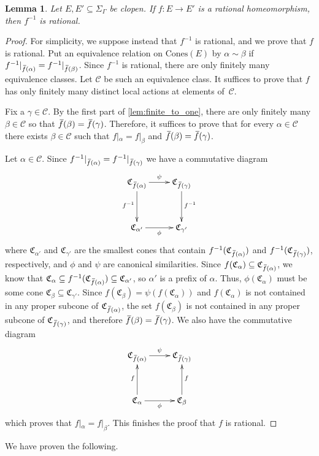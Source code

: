 \documentclass[11pt,letterpaper]{amsart}
\newtheorem{lemma}[theorem]{Lemma}
\theoremstyle{definition}
\newcommand{\C}{\mathfrak{C}}
\newcommand{\Cones}{\mathrm{Cones}}
\newcommand{\of}{\mkern 3.5mu\overline{\mkern-3.5mu f\mkern0.75mu}\mkern-0.75mu}
\begin{document}
\begin{lemma}\label{lem:inverses_rational}
Let $E,E'\subseteq \Sigma_\Gamma$ be clopen.  If $f\colon E\to E'$ is a rational homeomorphism, then $f^{-1}$ is rational.
\end{lemma}
\begin{proof}
For simplicity, we suppose instead that $f^{-1}$ is rational, and we prove that $f$ is rational.  Put an equivalence relation on $\Cones(E)$ by $\alpha\sim\beta$ if $f^{-1}|_{\of(\alpha)}=f^{-1}|_{\of(\beta)}$.  Since $f^{-1}$ is rational, there are only finitely many equivalence classes.  Let $\mathcal{C}$ be such an equivalence class.  It suffices to prove that $f$ has only finitely many distinct local actions at elements of~$\mathcal{C}$.

Fix a $\gamma\in \mathcal{C}$.  By the first part of \cref{lem:finite_to_one}, there are only finitely many $\beta\in\mathcal{C}$ so that $\of(\beta)=\of(\gamma)$.  Therefore, it suffices to prove that for every $\alpha\in\mathcal{C}$ there exists $\beta\in\mathcal{C}$ such that $f|_\alpha=f|_\beta$ and $\of(\beta)=\of(\gamma)$.

Let $\alpha\in \mathcal{C}$.  Since $f^{-1}|_{\of(\alpha)}=f^{-1}|_{\of(\gamma)}$ we have a commutative diagram
\[
\xymatrix@R=0.5in{
\C_{\of(\alpha)} \ar_{f^{-1}}[d] \ar^{\psi}[r] & 
\C_{\of(\gamma)} \ar^{f^{-1}}[d] \\ 
\C_{\alpha'}\ar_{\phi}[r] & \C_{\gamma'} }
\]
where $\C_{\alpha'}$ and $\C_{\gamma'}$ are the smallest cones that contain $f^{-1}(\C_{\of(\alpha)})$ and $f^{-1}(\C_{\of(\gamma)})$, respectively, and $\phi$ and $\psi$ are canonical similarities.  
Since $f(\C_\alpha)\subseteq \C_{\of(\alpha)}$, we know that $\C_\alpha\subseteq f^{-1}(\C_{\of(\alpha)})\subseteq \C_{\alpha'}$, so $\alpha'$ is a prefix of $\alpha$.  Thus, $\phi(\C_\alpha)$ must be some cone $\C_\beta\subseteq \C_{\gamma'}$.  Since $f(\C_\beta)=\psi(f(\C_\alpha))$ and $f(\C_\alpha)$ is not contained in any proper subcone of $\C_{\of(\alpha)}$, the set $f(\C_\beta)$ is not contained in any proper subcone of $\C_{\of(\gamma)}$, and therefore $\of(\beta)=\of(\gamma)$.  We also have the commutative diagram
\[
\xymatrix@R=0.5in{
\C_{\of(\alpha)} \ar^{\psi}[r] & 
\C_{\of(\gamma)} \\ 
\C_{\alpha}\ar_{\phi}[r]\ar^{f}[u] & \C_{\beta}\ar_{f}[u] }
\]
which proves that $f|_\alpha=f|_\beta$. This finishes the proof that $f$ is rational.
\end{proof}

We have proven the following.
\end{document}
